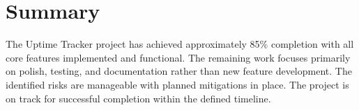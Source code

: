 \section{Summary}

The Uptime Tracker project has achieved approximately 85\% completion with all core features implemented and functional. The remaining work focuses primarily on polish, testing, and documentation rather than new feature development. The identified risks are manageable with planned mitigations in place. The project is on track for successful completion within the defined timeline.

